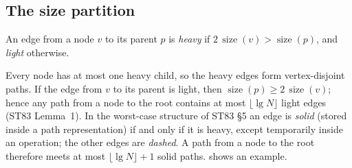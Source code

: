 \documentclass[11pt,a4paper,oneside]{report}
\theoremstyle{plain}
\theoremstyle{definition}
\theoremstyle{remark}
\newcommand{\size}{\operatorname{size}}
\begin{document}
\subsection{The size partition}
\begin{definition}
An edge from a node \(v\) to its parent \(p\) is \emph{heavy} if \(2\,\size(v)>\size(p)\), and
\emph{light} otherwise.
\end{definition}
Every node has at most one heavy child, so the heavy edges form vertex-disjoint paths. If the
edge from \(v\) to its parent is light, then \(\size(p)\ge 2\,\size(v)\); hence any path from a
node to the root contains at most \(\lfloor\lg N\rfloor\) light edges (ST83 Lemma~1). In the
worst-case structure of ST83 \S5 an edge is \emph{solid} (stored inside a path representation)
if and only if it is heavy, except temporarily inside an operation; the other edges are
\emph{dashed}. A path from a node to the root therefore meets at most \(\lfloor\lg N\rfloor+1\)
solid paths.  shows an example.
\end{document}
